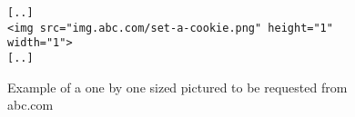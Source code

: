 \begin{figure}
\begin{verbatim}
[..]
<img src="img.abc.com/set-a-cookie.png" height="1" width="1"> 
[..]
\end{verbatim}
\caption{Example of a one by one sized pictured to be requested from abc.com}\label{fig:tracker-pixel}
\end{figure}
